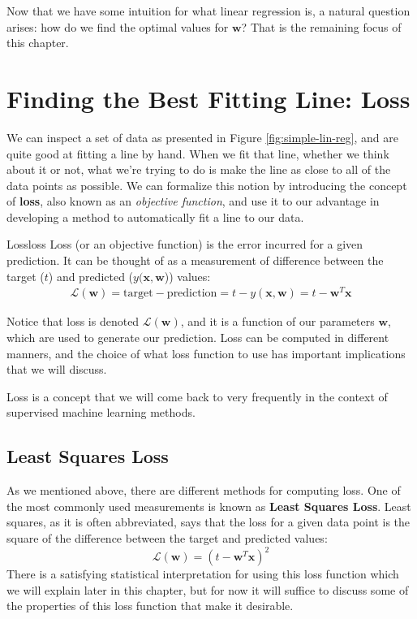 
Now that we have some intuition for what linear regression is, a natural question arises: how do we find the optimal values for $\textbf{w}$? That is the remaining focus of this chapter.

\section{Finding the Best Fitting Line: Loss}
We can inspect a set of data as presented in Figure \ref{fig:simple-lin-reg}, and are quite good at fitting a line by hand. When we fit that line, whether we think about it or not, what we're trying to do is make the line as close to all of the data points as possible. We can formalize this notion by introducing the concept of \textbf{loss}, also known as an \textit{objective function}, and use it to our advantage in developing a method to automatically fit a line to our data.


\begin{definition}{Loss}{loss}
Loss (or an objective function) is the error incurred for a given prediction. It can be thought of as a measurement of difference between the target ($t$) and predicted ($y(\textbf{x}, \textbf{w}$)) values:
\begin{align*}
    \mathcal{L}(\textbf{w}) = \text{target} - \text{prediction} = t - y(\textbf{x}, \textbf{w}) = \boxed{t - \textbf{w}^{T}\textbf{x}}
\end{align*}

Notice that loss is denoted $\mathcal{L}(\textbf{w})$, and it is a function of our parameters $\textbf{w}$, which are used to generate our prediction. Loss can be computed in different manners, and the choice of what loss function to use has important implications that we will discuss.
\end{definition}

Loss is a concept that we will come back to very frequently in the context of supervised machine learning methods.

\subsection{Least Squares Loss}
As we mentioned above, there are different methods for computing loss. One of the most commonly used measurements is known as \textbf{Least Squares Loss}. Least squares, as it is often abbreviated, says that the loss for a given data point is the square of the difference between the target and predicted values:
\begin{equation} \label{least-squares-loss-fn}
    \mathcal{L}(\textbf{w}) = (t - \textbf{w}^{T}\textbf{x})^2
\end{equation}
There is a satisfying statistical interpretation for using this loss function which we will explain later in this chapter, but for now it will suffice to discuss some of the properties of this loss function that make it desirable.

